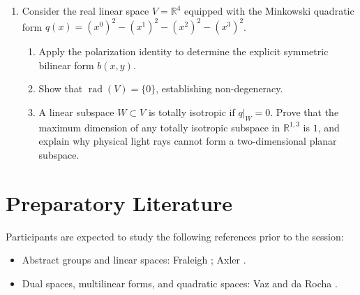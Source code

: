 \documentclass[11pt,a4paper]{article}
\newcommand{\R}{\mathbb{R}}
\newcommand{\rad}{\operatorname{rad}}
\begin{document}
\begin{enumerate}
  \item Consider the real linear space $V = \R^4$ equipped with the Minkowski
    quadratic form $q(x) = (x^0)^2 - (x^1)^2 - (x^2)^2 - (x^3)^2$.
    \begin{enumerate}
      \item Apply the polarization identity to determine the explicit
        symmetric bilinear form $b(x, y)$.
      \item Show that $\rad(V) = \{0\}$, establishing non-degeneracy.
      \item A linear subspace $W \subset V$ is totally isotropic if $q|_W = 0$.
        Prove that the maximum dimension of any totally isotropic subspace in
        $\R^{1,3}$ is $1$, and explain why physical light rays cannot form a
        two-dimensional planar subspace.
    \end{enumerate}
\end{enumerate}

\section{Preparatory Literature}
\label{sec:literature}

Participants are expected to study the following references prior to the
session:
\begin{itemize}
  \item Abstract groups and linear spaces: Fraleigh
    \cite[Chaps.~1.1, 1.2, and~7.33]{fraleighFirstCourseAbstract2021}; Axler
    \cite[Chaps.~1 and~2]{axlerLinearAlgebraDone2015}.
  \item Dual spaces, multilinear forms, and quadratic spaces: Vaz and da
    Rocha \cite[Chap.~1]{vazIntroductionCliffordAlgebras2016}.
\end{itemize}

\printbibliography
\end{document}
